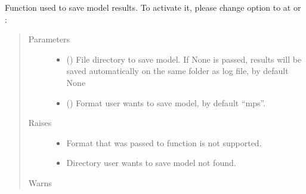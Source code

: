 \documentclass[letterpaper,10pt,english]{sphinxmanual}
\begin{document}
\begin{fulllineitems}
\begin{fulllineitems}
Function used to save model results. To activate it, please change
option  to  at 
or :

\begin{sphinxVerbatim}[commandchars=\\\{\}]
   

  

\end{sphinxVerbatim}
\begin{quote}\begin{description}
\item[{Parameters}] \leavevmode\begin{itemize}
\item {} 
 (\sphinxstyleliteralemphasis{\sphinxupquote{, }}) \textendash{} File directory to save model. If None is passed, results will be saved automatically on the same
folder as log file, by default None

\item {} 
 (\sphinxstyleliteralemphasis{\sphinxupquote{, }}) \textendash{} Format user wants to save model, by default “mps”.

\end{itemize}

\item[{Raises}] \leavevmode\begin{itemize}
\item {} 
 \textendash{} Format that was passed to function is not supported.

\item {} 
 \textendash{} Directory user wants to save model not found.

\end{itemize}

\item[{Warns}] \leavevmode
{}


\end{description}
\end{quote}
\end{fulllineitems}
\end{fulllineitems}
\end{document}
